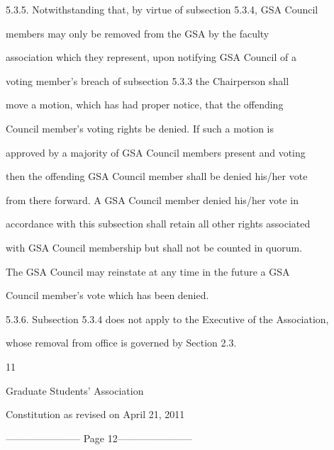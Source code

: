 5.3.5. Notwithstanding  that,  by  virtue  of  subsection  5.3.4,  GSA  Council  

        members   may   only   be   removed   from   the   GSA   by   the   faculty  

        association  which  they  represent,  upon  notifying  GSA  Council  of  a  

        voting  member's  breach  of  subsection  5.3.3  the  Chairperson  shall  

        move  a  motion,  which  has  had  proper  notice,  that  the  offending  

        Council   member's   voting   rights   be   denied.   If   such   a   motion   is  

        approved by a majority of GSA Council members present and voting  

        then the offending GSA Council member shall be denied his/her vote  

        from  there  forward.  A  GSA  Council  member  denied  his/her  vote  in  

        accordance with this subsection shall retain all other rights associated  

        with  GSA  Council  membership  but  shall  not  be  counted  in  quorum.  

        The  GSA  Council  may  reinstate  at  any  time  in  the  future  a  GSA  

        Council member's vote which has been denied.  



5.3.6.  Subsection 5.3.4 does  not  apply  to  the  Executive  of the  Association,  

        whose removal from office is governed by Section 2.3.  



  



                                                 

                                              11  



                                Graduate Students’ Association  



                           Constitution as revised on April 21, 2011  


----------------------- Page 12-----------------------

  



